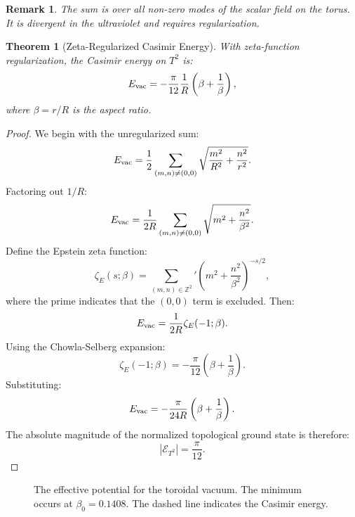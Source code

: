 \documentclass[12pt,oneside]{book}
\newtheorem{theorem}{Theorem}[chapter]
\newtheorem{remark}{Remark}[chapter]
\begin{document}
\begin{remark}
The sum is over all non-zero modes of the scalar field on the torus. It is divergent in the ultraviolet and requires regularization.
\end{remark}

\begin{theorem}[Zeta-Regularized Casimir Energy]
With zeta-function regularization, the Casimir energy on $T^2$ is:
\[
E_{\rm vac} = -\frac{\pi}{12}\frac{1}{R}\left(\beta + \frac{1}{\beta}\right),
\]
where $\beta = r/R$ is the aspect ratio.
\end{theorem}

\begin{proof}
We begin with the unregularized sum:
\[
E_{\rm vac} = \frac{1}{2}\sum_{(m,n)\neq(0,0)} \sqrt{\frac{m^2}{R^2} + \frac{n^2}{r^2}}.
\]
Factoring out $1/R$:
\[
E_{\rm vac} = \frac{1}{2R}\sum_{(m,n)\neq(0,0)} \sqrt{m^2 + \frac{n^2}{\beta^2}}.
\]
Define the Epstein zeta function:
\[
\zeta_E(s;\beta) = \sum_{(m,n)\in\mathbb{Z}^2}' \left(m^2 + \frac{n^2}{\beta^2}\right)^{-s/2},
\]
where the prime indicates that the $(0,0)$ term is excluded. Then:
\[
E_{\rm vac} = \frac{1}{2R}\zeta_E(-1;\beta).
\]
Using the Chowla-Selberg expansion:
\[
\zeta_E(-1;\beta) = -\frac{\pi}{12}\left(\beta + \frac{1}{\beta}\right).
\]
Substituting:
\[
E_{\rm vac} = -\frac{\pi}{24R}\left(\beta + \frac{1}{\beta}\right).
\]
The absolute magnitude of the normalized topological ground state is therefore:
\[
|\mathcal{E}_{T^2}| = \frac{\pi}{12}.
\]
\end{proof}

\begin{figure}[H]
\centering
{}
\caption{The effective potential for the toroidal vacuum. The minimum occurs at $\beta_0 = 0.1408$. The dashed line indicates the Casimir energy.}
\label{fig:potential}
\end{figure}
\end{document}
